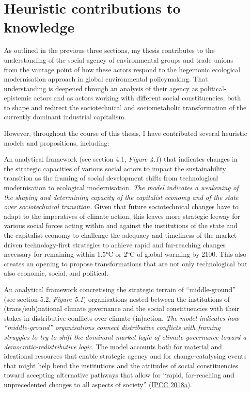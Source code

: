 \documentclass[a4paper, nobind]{templates/ociamthesis}
\begin{document}
\hypertarget{heuristic-contributions-to-knowledge}{%
\section{Heuristic contributions to knowledge}\label{heuristic-contributions-to-knowledge}}

As outlined in the previous three sections, my thesis contributes to the understanding of the social agency of environmental groups and trade unions from the vantage point of how these actors respond to the hegemonic ecological modernisation approach in global environmental policymaking. That understanding is deepened through an analysis of their agency as political-epistemic actors and as actors working with different social constituencies, both to shape and redirect the sociotechnical and sociometabolic transformation of the currently dominant industrial capitalism.

However, throughout the course of this thesis, I have contributed several heuristic models and propositions, including:

An analytical framework (see section 4.1, \emph{Figure 4.1}) that indicates changes in the strategic capacities of various social actors to impact the sustainability transition as the framing of social development shifts from technological modernisation to ecological modernisation. \emph{The model indicates a weakening of the shaping and determining capacity of the capitalist economy and of the state over sociotechnical transition.} Given that future sociotechnical changes have to adapt to the imperatives of climate action, this leaves more strategic leeway for various social forces acting within and against the institutions of the state and the capitalist economy to challenge the adequacy and timeliness of the market-driven technology-first strategies to achieve rapid and far-reaching changes necessary for remaining within 1.5°C or 2°C of global warming by 2100. This also creates an opening to propose transformations that are not only technological but also economic, social, and political.

An analytical framework concretising the strategic terrain of ``middle-ground'' (see section 5.2, \emph{Figure 5.1}) organisations nested between the institutions of (trans/sub)national climate governance and the social constituencies with their stakes in distributive conflicts over climate (in)action. \emph{The model indicates how ``middle-ground'' organisations connect distributive conflicts with framing struggles to try to shift the dominant market logic of climate governance toward a democratic-redistributive logic}. The model accounts both for material and ideational resources that enable strategic agency and for change-catalysing events that might help bend the institutions and the attitudes of social constituencies toward accepting alternative pathways that allow for ``rapid, far-reaching and unprecedented changes to all aspects of society'' (\protect\hyperlink{ref-ipcc_global_2018}{IPCC 2018a}).
\end{document}
